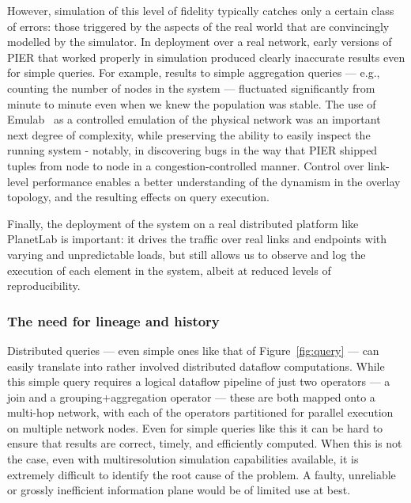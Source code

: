 \documentclass[10pt,twocolumn]{MyTightStyle}
\def\IP{information plane\xspace}
\begin{document}
However, simulation of this level of fidelity
typically catches only a certain class of errors: those triggered by the
aspects of the real world that are convincingly modelled by the
simulator.  In deployment over a real network, early versions of PIER
that worked properly in simulation produced clearly inaccurate results
even for simple queries. For example, results to simple aggregation
queries --- e.g., counting the number of nodes in the system ---  
fluctuated significantly from minute to minute even when we knew the
population was stable.  The use of Emulab~\cite{White2002} as a controlled
emulation of the physical network was an important next degree of
complexity, while preserving the ability to easily inspect the running
system - notably, in discovering bugs in the way that PIER shipped
tuples from node to node in a congestion-controlled manner. Control
over link-level performance enables a better  
understanding of the dynamism in the overlay topology, and the
resulting effects on query execution.

Finally, the deployment of the system on a real
distributed platform like PlanetLab is important: it drives the
traffic over real links and endpoints with varying and unpredictable
loads, but still allows us to observe and log the execution of each
element in the system, albeit at reduced levels of reproducibility.


\subsubsection*{The need for lineage and history}
Distributed queries --- even simple ones like that of
Figure~\ref{fig:query} --- can easily translate into rather involved
distributed dataflow computations.  While this simple query requires a
logical dataflow pipeline of just two operators --- a join and a
grouping+aggregation operator --- these are both mapped onto a
multi-hop network, with each of the operators partitioned for parallel
execution on multiple network nodes.  Even for simple queries like
this it can
be hard to ensure that results are correct, timely, and efficiently
computed.
When this is not the case, even with multiresolution simulation
capabilities available, it is extremely difficult to identify the root cause of the
problem.  A faulty,  unreliable or grossly inefficient \IP would be of
limited use at best.
\end{document}
